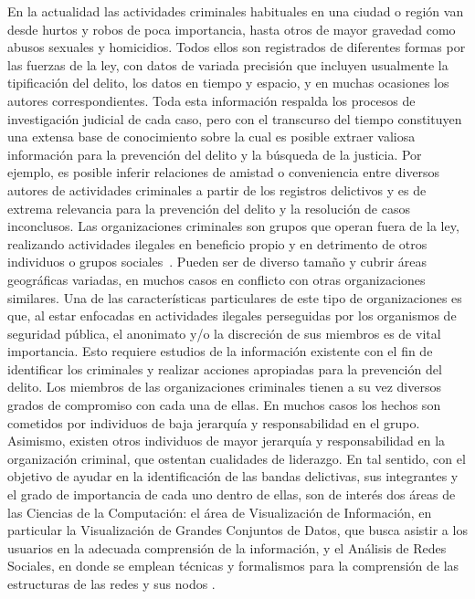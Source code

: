 
En la actualidad las actividades criminales habituales en una ciudad o región van desde hurtos y robos de poca importancia, hasta otros de mayor gravedad como abusos sexuales y  homicidios. Todos ellos son registrados de diferentes formas por las fuerzas de la ley, con datos de variada precisión que incluyen usualmente la tipificación del delito, los datos en tiempo y espacio, y en muchas ocasiones los autores correspondientes.
Toda esta información respalda los procesos de investigación judicial de cada caso, pero con el transcurso del tiempo constituyen una extensa base de conocimiento sobre la cual es posible extraer valiosa información para la prevención del delito y la búsqueda de la justicia. 
Por ejemplo, es posible inferir relaciones de amistad o conveniencia entre diversos autores de actividades criminales a partir de los registros delictivos y es de extrema relevancia para la prevención del delito y la resolución de casos inconclusos.
Las organizaciones criminales son grupos que operan fuera de la ley, realizando actividades ilegales en beneficio propio y en detrimento de otros individuos o grupos sociales~\cite{finckenauer2005problems}. Pueden ser de diverso tamaño y cubrir áreas geográficas variadas, en muchos casos en conflicto con otras organizaciones similares. Una de las características particulares de este tipo de organizaciones es que, al estar enfocadas en actividades ilegales perseguidas por los organismos de seguridad pública, el anonimato y/o la discreción de sus miembros es de vital importancia. Esto requiere estudios de la información existente con el fin de identificar los criminales y realizar acciones apropiadas para la prevención del delito.
Los miembros de las organizaciones criminales tienen a su vez diversos grados de compromiso con cada una de ellas. En muchos casos los hechos son cometidos por individuos de baja jerarquía y responsabilidad en el grupo. Asimismo, existen otros individuos de mayor jerarquía y responsabilidad en la organización criminal, que ostentan cualidades de liderazgo.
En tal sentido, con el objetivo de ayudar en la identificación de las bandas delictivas, sus integrantes y el grado de importancia de cada uno dentro de ellas, son de interés dos áreas de las Ciencias de la Computación: el área de Visualización de Información, en particular la Visualización de Grandes Conjuntos de Datos, que busca asistir a los usuarios en la adecuada comprensión de la información, y el Análisis de Redes Sociales, en donde se emplean técnicas y formalismos para la comprensión de las estructuras de las redes y sus nodos . 

